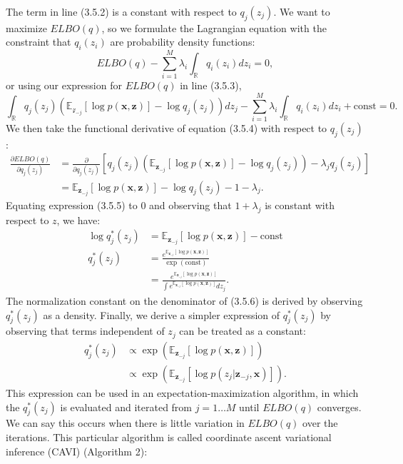 \documentclass[honours,12pt]{unswthesis}
\newcommand{\R}{\mathbb{R}}
\numberwithin{equation}{section}
\theoremstyle{definition}
\begin{document}
The term in line (3.5.2) is a constant with respect to $q_j(z_j)$. We want to maximize $ELBO(q)$, so we formulate the Lagrangian equation with the constraint that $q_i(z_i)$ are probability density functions:
\begin{equation*}
ELBO(q)-\sum^M_{i=1}\lambda_i\int_\R q_i(z_i)dz_i=0,
\end{equation*}
or using our expression for $ELBO(q)$ in line (3.5.3),
\begin{equation}
\int_\R q_j(z_j)\left(\mathbb{E}_{\mathcal{z}_{-j}}[\log p(\bm{x},\bm{z})]-\log q_j(z_j)\right)dz_j-\sum^M_{i=1}\lambda_i\int_\R q_i(z_i)dz_i+\text{const}=0.
\end{equation} 
We then take the functional derivative of equation (3.5.4) with respect to $q_j(z_j)$:
\begin{align}
\frac{\partial ELBO(q)}{\partial q_j(z_j)}&= \frac{\partial}{\partial q_j(z_j)}\left[q_j(z_j)\left(\mathbb{E}_{\bm{z}_{-j}}[\log p(\bm{x},\bm{z})]-\log q_j(z_j)\right)-\lambda_jq_j(z_j)\right]\nonumber
\\&= \mathbb{E}_{\bm{z}_{-j}}[\log p(\bm{x},\bm{z})]-\log q_j(z_j)-1-\lambda_j.
\end{align}
Equating expression (3.5.5) to 0 and observing that $1+\lambda_j$ is constant with respect to $z$, we have:
\begin{align}
\log q_j^*(z_j)&= \mathbb{E}_{\bm{z}_{-j}}[\log p(\bm{x},\bm{z})]-\text{const} \nonumber\\
q_j^*(z_j)&=\frac{e^{\mathbb{E}_{\bm{z}_{-j}}[\log p(\bm{x},\bm{z})]}}{\exp{(\text{const})}}\nonumber\\
&= \frac{e^{\mathbb{E}_{\bm{z}_{-j}}[\log p(\bm{x},\bm{z})]}}{\int e^{\mathbb{E}_{\bm{z}_{-j}}[\log p(\bm{x},\bm{z})]}dz_j}.
\end{align}
\newpage
The normalization constant on the denominator of (3.5.6) is derived by observing $q^*_j(z_j)$ as a density. Finally, we derive a simpler expression of $q^*_j(z_j)$ by observing that terms independent of $z_j$ can be treated as a constant:
\begin{align}
q^*_j(z_j)&\propto \exp\left(\mathbb{E}_{\bm{z}_{-j}}[\log p(\bm{x},\bm{z})]\right)\nonumber\\
&\propto \exp\left(\mathbb{E}_{\bm{z}_{-j}}[\log p(z_j|\bm{z}_{-j},\bm{x})]\right).
\end{align}
This expression can be used in an expectation-maximization algorithm, in which the $q^*_j(z_j)$ is evaluated and iterated from $j=1\dots M$ until $ELBO(q)$ converges. We can say this occurs when there is little variation in $ELBO(q)$ over the iterations. This particular algorithm is called coordinate ascent variational inference (CAVI) (Algorithm 2):\\
\end{document}
